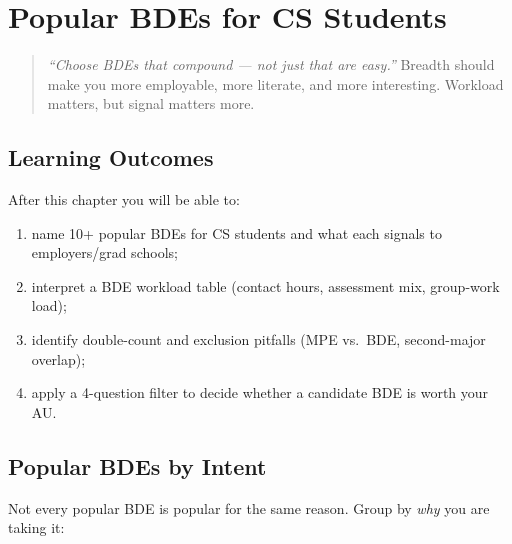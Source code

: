 \chapter{Popular BDEs for CS Students}
\label{ch:popular-bde}

\begin{quote}
\emph{``Choose BDEs that compound --- not just that are easy.''} Breadth should make you more employable, more literate, and more interesting. Workload matters, but signal matters more.
\end{quote}

\noindent{}
\vspace{0.4em}

\section*{Learning Outcomes}
After this chapter you will be able to:
\begin{enumerate}[label=(L\arabic*)]
    \item name 10+ popular BDEs for CS students and what each signals to employers/grad schools;
    \item interpret a BDE workload table (contact hours, assessment mix, group-work load);
    \item identify double-count and exclusion pitfalls (MPE vs.\ BDE, second-major overlap);
    \item apply a 4-question filter to decide whether a candidate BDE is worth your AU.
\end{enumerate}

\section{Popular BDEs by Intent}
\label{sec:popular-by-intent}

Not every popular BDE is popular for the same reason. Group by \emph{why} you are taking it:

